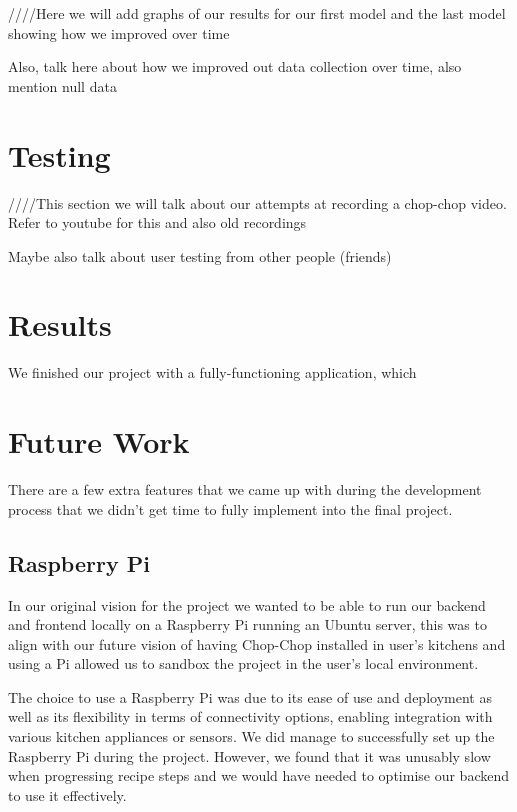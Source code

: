 \documentclass{article}
\begin{document}
////Here we will add graphs of our results for our first model and the last model showing how we improved over time

Also, talk here about how we improved out data collection over time, also mention null data


\section{Testing}
////This section we will talk about our attempts at recording a chop-chop video. Refer to youtube for this and also old recordings

Maybe also talk about user testing from other people (friends)

\section{Results}
We finished our project with a fully-functioning application, which

\section{Future Work}
There are a few extra features that we came up with during the development process that we didn’t get time to fully implement into the final project.
\subsection{Raspberry Pi}
In our original vision for the project we wanted to be able to run our backend and frontend locally on a Raspberry Pi running an Ubuntu server, this was to align with our future vision of having Chop-Chop installed in user's kitchens and using a Pi allowed us to sandbox the project in the user's local environment.

The choice to use a Raspberry Pi was due to its ease of use and deployment as well as its flexibility in terms of connectivity options, enabling integration with various kitchen appliances or sensors. We did manage to successfully set up the Raspberry Pi during the project. However, we found that it was unusably slow when progressing recipe steps and we would have needed to optimise our backend to use it effectively.
\end{document}
